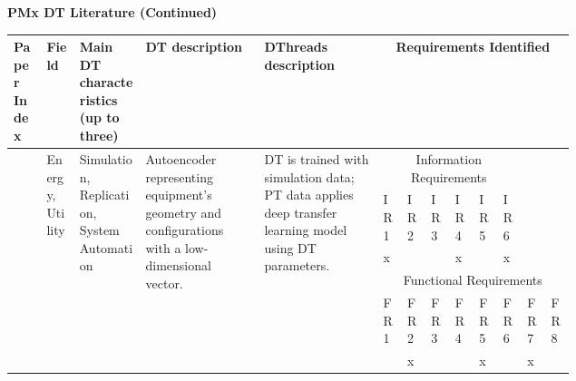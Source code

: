 \documentclass[runningheads]{llncs}
\begin{document}
\begin{landscape}
\begin{small}
\begin{longtable}
          \end{longtable}
        \end{small}

        \newpage
        \textbf{PMx DT Literature (Continued)}
        \vspace{2mm}
        
        \begin{small}
    \begin{longtable}{p{0.05\linewidth}p{0.05\linewidth}p{0.1\linewidth}p{0.18\linewidth}p{0.18\linewidth}p{0.02\linewidth}p{0.02\linewidth}p{0.02\linewidth}p{0.02\linewidth}p{0.02\linewidth}p{0.02\linewidth}p{0.02\linewidth}p{0.02\linewidth}}
    \bottomrule
        Paper Index & Field &  Main DT characteristics (up to three) & DT description & DThreads description & \multicolumn{8}{c}{Requirements Identified} \\\bottomrule
              
        \vspace{3mm}
        \multirow{6}{=}{\cite{deebak2022twin}} & \multirow{6}{=}{Energy, Utility} &  \multirow{6}{=}{Simulation, Replication, System Automation} & \multirow{6}{=}{Autoencoder representing equipment's geometry and configurations with a low-dimensional vector.} & \multirow{6}{=}{DT is trained with simulation data; PT data applies deep transfer learning model using DT parameters.} & \multicolumn{6}{c}{Information Requirements} &  \\\cmidrule{6-11}
        & & & & & IR1 & IR2 & IR3 & IR4 & IR5 & IR6 & & \\\cmidrule{6-11}
        & & & & & x  &  &  & x &  & x & & \\\cmidrule{6-13}
        \vspace{3mm}
        & & & & & \multicolumn{8}{c}{Functional Requirements} \\\cmidrule{6-13}
        & & & & & FR1 & FR2 & FR3 & FR4 & FR5 & FR6 & FR7 & FR8 \\\cmidrule{6-13}
        & & & & &  & x &  &  & x  &  & x & \\\bottomrule



\end{longtable}
\end{small}
\end{landscape}
\end{document}
